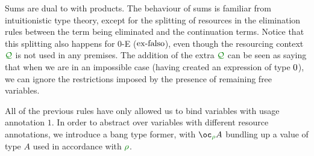 Sums are dual to with products.
The behaviour of sums is familiar from intuitionistic type theory, except for
the splitting of resources in the elimination rules between the term being
eliminated and the continuation terms.
Notice that this splitting also happens for $0$-E ($\operatorname{ex-falso}$), even though the
resourcing context $\resctx Q$ is not used in any premises.
The addition of the extra $\resctx Q$ can be seen as saying that when we are in
an impossible case (having created an expression of type $0$), we can
ignore the restrictions imposed by the presence of remaining free variables.


All of the previous rules have only allowed us to bind variables with usage
annotation $1$.
In order to abstract over variables with different resource annotations, we
introduce a bang type former, with $\excl{\rho}{A}$ bundling up a value of type
$A$ used in accordance with $\rescomment \rho$.


